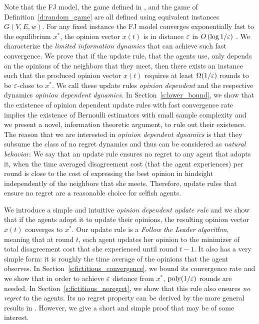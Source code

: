 Note that the FJ model, the game defined in \cite{BKO11}, and the game of
Definition~\ref{d:random_game} are all defined using equivalent instances
$G(V,E,w)$.  For any fixed instance the FJ model converges exponentially fast
to the equilibrium $x^*$, the opinion vector $x(t)$ is in distance $\varepsilon$ in
$O\left(\log 1/\varepsilon\right)$ \cite{GS14}.  We characterize the \emph{limited
  information dynamics} that can achieve such fast convergence.  We prove that
if the update rule, that the agents use, only depends on the opinions of the
neighbors that they meet, then there exists an instance such that the produced
opinion vector $x(t)$ requires at least $\Omega(1/\varepsilon)$ rounds to be
$\varepsilon$-close to $x^*$. We call these update rules \emph{opinion dependent} and
the respective dynamics \emph{opinion dependent dynamics}.  In
Section~\ref{s:lower_bound}, we show that the existence of opinion dependent
update rules with fast convergence rate implies the existence of Bernoulli
estimators with small sample complexity and we present a novel, information
theoretic argument, to rule out their existence.  The reason that we are
interested in \emph{opinion dependent dynamics} is that they subsume the class
of no regret dynamics and thus can be considered as \emph{natural behavior}.
We say that an update rule ensures no regret to any agent that adopts it, when
the time averaged disagreement cost (that the agent experiences) per round is
close to the cost of expressing the best opinion in hindsight independently of
the neighbors that she meets. Therefore, update rules that ensure no regret are
a reasonable choice for selfish agents.

We introduce a simple and intuitive \emph{opinion dependent update rule} and we
show that if the agents adopt it to update their opinions, the resulting
opinion vector $x(t)$ converges to $x^*$.  Our update rule is a \emph{Follow
  the Leader algorithm}, meaning that at round $t$, each agent updates her
opinion to the minimizer of total disagreement cost that she experienced until
round $t-1$.  It also has a very simple form: it is roughly the time average of
the opinions that the agent observes.  In
Section~\ref{s:fictitious_convergence}, we bound its convergence rate and we
show that in order to achieve $\varepsilon$ distance from $x^*$, $\mathrm{poly}(1/\varepsilon)$
rounds are needed.  In Section~\ref{s:fictitious_noregret}, we show that this
rule also ensures \emph{no regret} to the agents.  Its no regret property can
be derived by the more general results in \cite{HAK07}.  However, we give a
short and simple proof that may be of some interest.

